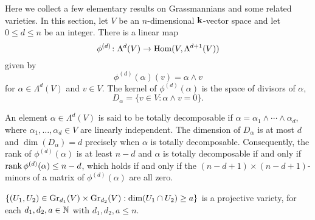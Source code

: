 \documentclass[a4paper, 11pt]{report}
\begin{document}
Here we collect a few elementary results on Grassmannians and some related varieties. In this section, let $V$ be an $n$-dimensional $\field$-vector space and let $0\le d\le n$ be an integer. There is a linear map
\begin{equation*}
\phi^{(d)}\colon\Lambda^d(V)\to\HOM(V,\Lambda^{d+1}(V))
\end{equation*}
given by
\begin{equation*}
\phi^{(d)}(\alpha)(v)=\alpha\wedge v
\end{equation*}
for $\alpha\in\Lambda^d(V)$ and $v\in V$.
The kernel of $\phi^{(d)}(\alpha)$ is the space of divisors of $\alpha$,
\begin{equation*}
D_\alpha=\{v\in V:\alpha\wedge v=0\}.
\end{equation*}

An element $\alpha\in\Lambda^d(V)$ is said to be totally decomposable if $\alpha = \alpha_1\wedge\cdots\wedge\alpha_d$, where $\alpha_1,\ldots,\alpha_d\in V$ are linearly independent. The dimension of $D_\alpha$ is at most $d$ and $\dim(D_\alpha)=d$ precisely when $\alpha$ is totally decomposable. Consequently, the rank of $\phi^{(d)}(\alpha)$ is at least $n-d$ and $\alpha$ is totally decomposable if and only if $\rank{\phi^{(d)}(\alpha)}\le n-d$, which holds if and only if the $(n-d+1)\times(n-d+1)$-minors of a matrix of $\phi^{(d)}(\alpha)$ are all zero.

\begin{lemma}\label{lemma:grassmannian-incidence-varieties}
$\{(U_1,U_2)\in\GR[d_1]{V}\times\GR[d_2]{V}: \dim(U_1\cap U_2)\geq a\}$ is a projective variety, for each $d_1,d_2,a\in\naturals$ with $d_1,d_2,a\le n$.
\end{lemma}
\end{document}
